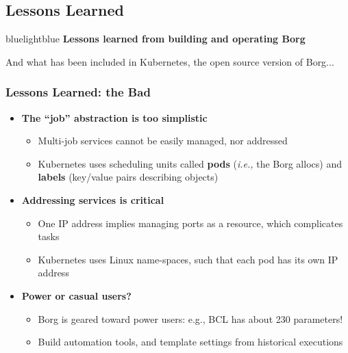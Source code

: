 \subsection{Lessons Learned}
\begin{frame}
 \begin{colorblock}{blue}{lightblue}{ }
    {\Large \textbf{Lessons learned from building and operating Borg}}

    And what has been included in Kubernetes, the open source version of Borg...
  \end{colorblock}
\end{frame}

\begin{frame}\frametitle{Lessons Learned: the Bad}
\begin{itemize}
	\item {\bf The ``job'' abstraction is too simplistic}
	\begin{itemize}
		\item Multi-job services cannot be easily managed, nor addressed
		\item Kubernetes uses scheduling units called {\bf pods} ({\it i.e.,} the Borg allocs) and {\bf labels} (key/value pairs describing objects)
	\end{itemize}
	\item {\bf Addressing services is critical}
	\begin{itemize}
		\item One IP address implies managing ports as a resource, which complicates tasks
		\item Kubernetes uses Linux name-spaces, such that each pod has its own IP address
	\end{itemize}
	\item {\bf Power or casual users?}
	\begin{itemize}
		\item Borg is geared toward power users: e.g., BCL has about 230 parameters!
		\item Build automation tools, and template settings from historical executions
	\end{itemize}
\end{itemize}
\end{frame}


